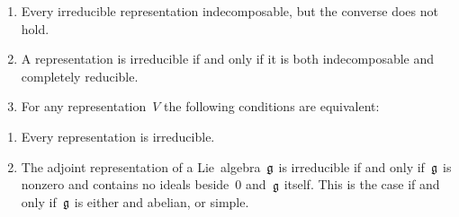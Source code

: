 \begin{remark}
  \leavevmode
  \begin{enumerate}
    \item
      Every irreducible representation indecomposable, but the converse does not hold.
    \item
      A representation is irreducible if and only if it is both indecomposable and completely reducible.
    \item
      For any representation~$V$ the following conditions are equivalent:
  \end{enumerate}
\end{remark}


\begin{example}
  \leavevmode
  \begin{enumerate}
    \item
      Every {\onedimensional} representation is irreducible.
    \item
      The adjoint representation of a Lie~algebra~$\mathfrak{g}$ is irreducible if and only if~$\mathfrak{g}$ is nonzero and contains no ideals beside~$0$ and~$\mathfrak{g}$ itself.
      This is the case if and only if~$\mathfrak{g}$ is either {\onedimensional} and abelian, or simple.
  \end{enumerate}
\end{example}


